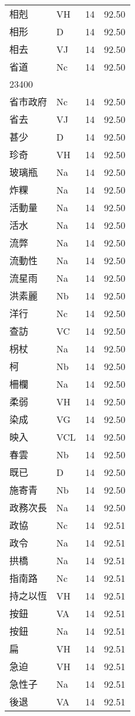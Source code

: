 \documentclass[twocolumn]{book}
\begin{document}
\begin{supertabular}{llrr}
相剋 & VH & 14 &  92.50\\
相形 & D & 14 &  92.50\\
相去 & VJ & 14 &  92.50\\
省道 & Nc & 14 &  92.50\\
23400\\
省市政府 & Nc & 14 &  92.50\\
省去 & VJ & 14 &  92.50\\
甚少 & D & 14 &  92.50\\
珍奇 & VH & 14 &  92.50\\
玻璃瓶 & Na & 14 &  92.50\\
炸粿 & Na & 14 &  92.50\\
活動量 & Na & 14 &  92.50\\
活水 & Na & 14 &  92.50\\
流弊 & Na & 14 &  92.50\\
流動性 & Na & 14 &  92.50\\
流星雨 & Na & 14 &  92.50\\
洪素麗 & Nb & 14 &  92.50\\
洋行 & Nc & 14 &  92.50\\
查訪 & VC & 14 &  92.50\\
枴杖 & Na & 14 &  92.50\\
柯 & Nb & 14 &  92.50\\
柵欄 & Na & 14 &  92.50\\
柔弱 & VH & 14 &  92.50\\
染成 & VG & 14 &  92.50\\
映入 & VCL & 14 &  92.50\\
春雲 & Nb & 14 &  92.50\\
既已 & D & 14 &  92.50\\
施寄青 & Nb & 14 &  92.50\\
政務次長 & Na & 14 &  92.50\\
政協 & Nc & 14 &  92.51\\
政令 & Na & 14 &  92.51\\
拱橋 & Na & 14 &  92.51\\
指南路 & Nc & 14 &  92.51\\
持之以恆 & VH & 14 &  92.51\\
按鈕 & VA & 14 &  92.51\\
按鈕 & Na & 14 &  92.51\\
扁 & VH & 14 &  92.51\\
急迫 & VH & 14 &  92.51\\
急性子 & Na & 14 &  92.51\\
後退 & VA & 14 &  92.51\\

\end{supertabular}
\end{document}
